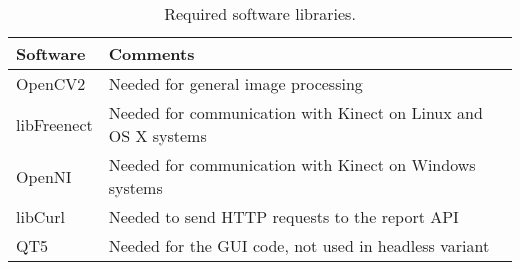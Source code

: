 \begin{table} [hbt]
\begin{center}
  \begin{tabular}{ | l | l | }
    \hline
    \textbf{Software} & \textbf{Comments} \\ \hline
    OpenCV2 & Needed for general image processing  \\ \hline
    libFreenect & Needed for communication with Kinect on Linux and OS X systems  \\ \hline
    OpenNI & Needed for communication with Kinect on Windows systems  \\ \hline
    libCurl & Needed to send HTTP requests to the report API \\ \hline
    QT5 & Needed for the GUI code, not used in headless variant \\ \hline
  \end{tabular}
  \label{reqSoftware}
  \caption{Required software libraries.}
\end{center}
\end{table}
